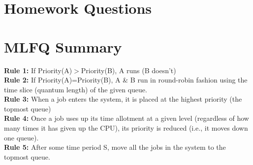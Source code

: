 \documentclass{article}
\begin{document}
\section{Homework Questions}

\section*{MLFQ Summary}

\textbf{Rule 1:} If Priority(A)$>$Priority(B), A runs (B doesn't) \\
\textbf{Rule 2:} If Priority(A)=Priority(B), A \& B run in round-robin fashion using the time slice (quantum length) of the given queue. \\
\textbf{Rule 3:} When a job enters the system, it is placed at the highest priority (the topmost queue) \\
\textbf{Rule 4:} Once a job uses up its time allotment at a given level (regardless of how many times it has given up the CPU), its priority is reduced (i.e., it moves down one queue). \\
\textbf{Rule 5:} After some time period S, move all the jobs in the system to the topmost queue. 
\end{document}
